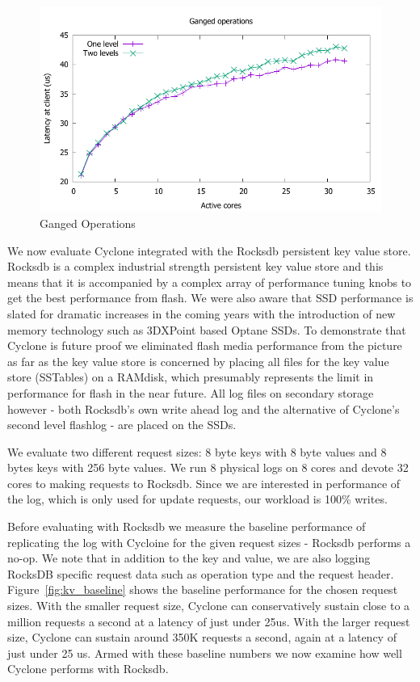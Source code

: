\documentclass[10pt, preprint, nonatbib]{sigplanconf}
\begin{document}
\begin{figure}
\includegraphics[scale=0.6]{results2/multi.pdf}
\caption{Ganged Operations}
\label{fig:ganged}
\end{figure}

We now evaluate Cyclone integrated with the Rocksdb persistent key value
store. Rocksdb is a complex industrial strength persistent key value store and
this means that it is accompanied by a complex array of performance tuning knobs
to get the best performance from flash. We were also aware that SSD performance
is slated for dramatic increases in the coming years with the introduction of
new memory technology such as 3DXPoint based Optane SSDs. To demonstrate that
Cyclone is future proof we eliminated flash media performance from the picture
as far as the key value store is concerned by placing all files for the key
value store (SSTables) on a RAMdisk, which presumably represents the limit in
performance for flash in the near future. All log files on secondary storage
however - both Rocksdb's own write ahead log and the alternative of Cyclone's
second level flashlog - are placed on the SSDs.

We evaluate two different request sizes: 8 byte keys with 8 byte values and 8
bytes keys with 256 byte values. We run 8 physical logs on 8 cores and devote 32
cores to making requests to Rocksdb. Since we are interested in performance of
the log, which is only used for update requests, our workload is 100\% writes.

Before evaluating with Rocksdb we measure the baseline performance of
replicating the log with Cycloine for the given request sizes - Rocksdb performs
a no-op. We note that in addition to the key and value, we are also logging
RocksDB specific request data such as operation type and the request header.
Figure~\ref{fig:kv_baseline} shows the baseline performance for the chosen
request sizes. With the smaller request size, Cyclone can conservatively sustain
close to a million requests a second at a latency of just under 25us. With the
larger request size, Cyclone can sustain around 350K requests a second, again at
a latency of just under 25 us. Armed with these baseline numbers we now examine
how well Cyclone performs with Rocksdb.
\end{document}
